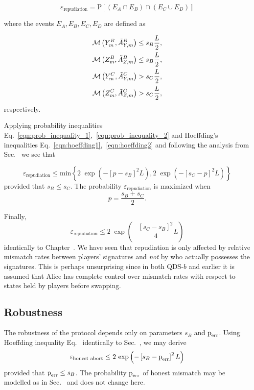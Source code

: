 \begin{equation}
\varepsilon_{\text{repudiation}} = \text{P}\left[\left(E_A \cap E_B\right) \cap \left(E_C \cup E_D\right) \right]
\end{equation}

\noindent where the events $E_A, E_B, E_C, E_D$ are defined as

\begin{align}
\mathcal{M}\left(Y_m^B, \tilde{A}_{Y, m}^B\right) \le s_B \frac{L}{2}, \notag \\
%
\mathcal{M}\left(Z_m^B, \tilde{A}_{Z, m}^B\right) \le s_B \frac{L}{2}, \notag \\
%
\mathcal{M}\left(Y_m^C, \tilde{A}_{Y, m}^C\right) > s_C \frac{L}{2}, \notag \\
%
\mathcal{M}\left(Z_m^C, \tilde{A}_{Z, m}^C\right) > s_C \frac{L}{2},
\end{align}
respectively.

Applying probability inequalities Eq.~\ref{eqn:prob_inequality_1},~\ref{eqn:prob_inequality_2} and Hoeffding's inequalities Eq.~\ref{eqn:hoeffding1},~\ref{eqn:hoeffding2} and following the analysis from Sec.~ we see that

\begin{equation}
\varepsilon_{\text{repudiation}} \le \text{min}\left\{ 2 \; \exp\left(-\left[ p - s_B\right]^2 L\right), 2 \; \exp\left( - \left[ s_C - p\right]^2 L\right) \right\}
\end{equation}
\noindent 
provided that $s_B \le s_C$. The probability $\varepsilon_{\text{repudiation}}$ is maximized when
\begin{equation}
p = \frac{s_B + s_C}{2}.
\end{equation}

\noindent Finally,
\begin{equation}\label{eqn:aqc_repudiation}
\varepsilon_{\text{repudiation}} \le 2 \; \exp\left( - \frac{\left[s_C - s_B\right]^2}{4}L\right)
\end{equation}
identically to Chapter~. We have seen that repudiation is only affected by relative mismatch rates between players' signatures and \emph{not} by who actually possesses the signatures. This is perhaps unsurprising since in both QDS-$b$ and earlier it is assumed that Alice has complete control over mismatch rates with respect to states held by players before swapping.

\subsection{Robustness}
The robustness of the protocol depends only on parameters $s_B$ and $\text{p}_{\text{err}}$. Using Hoeffding inequality Eq.~ identically to Sec.~, we may derive 
\begin{equation}\label{eqn:aqc_robustness}
\varepsilon_{\text{honest abort}} \le 2 \, \exp\left( - \left[s_B - \text{p}_{\text{err}}\right]^2 L\right)
\end{equation}
provided that $\text{p}_{\text{err}} \le s_B$. The probability $\text{p}_{\text{err}}$ of honest mismatch may be modelled as in Sec.~ and does not change here.

